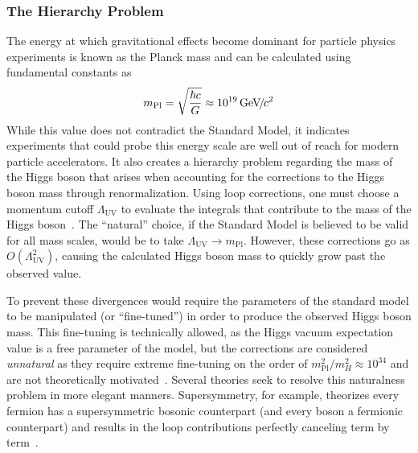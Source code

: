 \subsubsection{The Hierarchy Problem} \label{sec:hierarchy}
The energy at which gravitational effects become dominant for particle physics experiments is known as the Planck mass and can be calculated using fundamental constants as
\begin{equation}
	m_\text{Pl}=\sqrt{\frac{\hbar c}{G}}\approx10^{19}{\,\text{Ge\hspace{-.08em}V\hspace{-0.16em}/\hspace{-0.08em}}c^\text{2}}
\end{equation}
While this value does not contradict the Standard Model, it indicates experiments that could probe this energy scale are well out of reach for modern particle accelerators. It also creates a hierarchy problem regarding the mass of the Higgs boson that arises when accounting for the corrections to the Higgs boson mass through renormalization. Using loop corrections, one must choose a momentum cutoff $\Lambda_\text{UV}$ to evaluate the integrals that contribute to the mass of the Higgs boson~\cite{Peskin:1995ev}. The ``natural'' choice, if the Standard Model is believed to be valid for all mass scales, would be to take $\Lambda_\text{UV}\to m_\text{Pl}$. However, these corrections go as $O(\Lambda_\text{UV}^2)$, causing the calculated Higgs boson mass to quickly grow past the observed value.

To prevent these divergences would require the parameters of the standard model to be manipulated (or ``fine-tuned'') in order to produce the observed Higgs boson mass. This fine-tuning is technically allowed, as the Higgs vacuum expectation value is a free parameter of the model, but the corrections are considered \textit{unnatural} as they require extreme fine-tuning on the order of $m_\text{Pl}^2/m_H^2\approx10^{34}$ and are not theoretically motivated~\cite{hierarchy}. Several theories seek to resolve this naturalness problem in more elegant manners. Supersymmetry, for example, theorizes every fermion has a supersymmetric bosonic counterpart (and every boson a fermionic counterpart) and results in the loop contributions perfectly canceling term by term~\cite{susy}.

